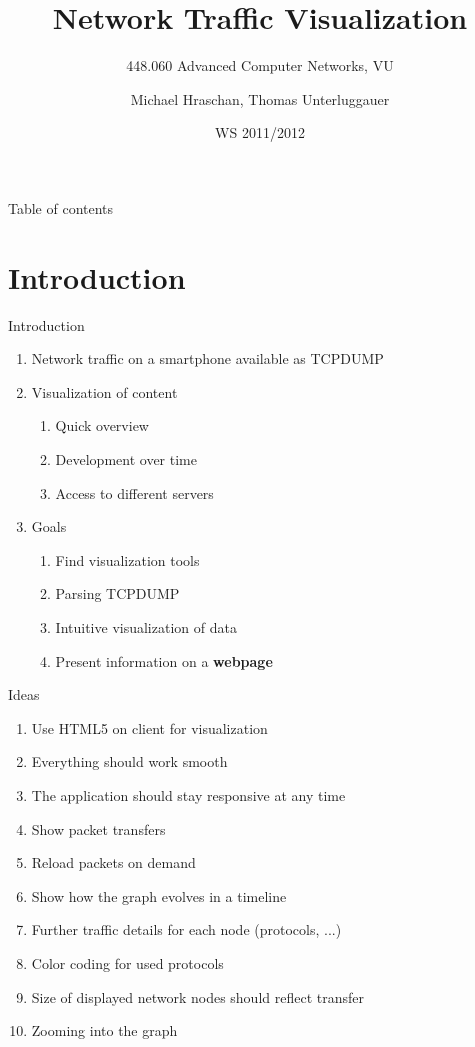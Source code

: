 \documentclass{beamer}
\title
{Network Traffic Visualization}
\subtitle
{448.060 Advanced Computer Networks, VU}
\author
{Michael Hraschan, Thomas Unterluggauer}
\date
{WS 2011/2012}
\begin{document}
\lstset{language=XML,tabsize=2,basicstyle=\footnotesize,breaklines=true}

\begin{frame}
	\titlepage
\end{frame}

\begin{frame}{Table of contents}
	\tableofcontents
\end{frame}

\section{Introduction}
  
\begin{frame}{Introduction}
 \begin{enumerate}
  \item Network traffic on a smartphone available as TCPDUMP 
  \item Visualization of content
  \begin{enumerate}
    \item Quick overview
    \item Development over time
    \item Access to different servers
  \end{enumerate}
  \item Goals
  \begin{enumerate}
    \item Find visualization tools
    \item Parsing TCPDUMP \cite{TCPDUMP}
    \item Intuitive visualization of data
    \item Present information on a \textbf{webpage}
  \end{enumerate}
 \end{enumerate}
\end{frame}

\begin{frame}{Ideas}
 \begin{enumerate}
  \item Use HTML5 on client for visualization
  \item Everything should work smooth
  \item The application should stay responsive at any time
  \item Show packet transfers
  \item Reload packets on demand
  \item Show how the graph evolves in a timeline
  \item Further traffic details for each node (protocols, ...)
  \item Color coding for used protocols
  \item Size of displayed network nodes should reflect transfer
  \item Zooming into the graph 
 \end{enumerate}
\end{frame}
\end{document}
